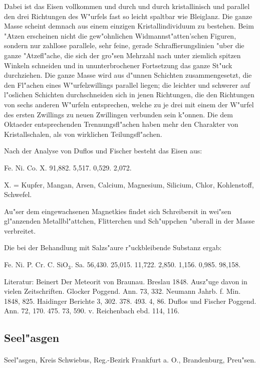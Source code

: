 \documentclass[a4paper, 11pt, oneside]{article}
\begin{document}
Dabei ist das Eisen vollkommen und durch und durch kristallinisch und parallel den drei Richtungen des W"urfels fast so leicht spaltbar wie Bleiglanz. Die ganze Masse scheint demnach aus einem einzigen Kristallindividuum zu bestehen. Beim "Atzen erscheinen nicht die gew"ohnlichen Widmannst"atten'schen Figuren, sondern nur zahllose parallele, sehr feine, gerade Schraffierungslinien "uber die ganze "Atzefl"ache, die sich der gro"sen Mehrzahl nach unter ziemlich spitzen Winkeln schneiden und in ununterbrochener Fortsetzung das ganze St"uck durchziehen. Die ganze Masse wird aus d"unnen Schichten zusammengesetzt, die den Fl"achen eines W"urfelzwillings parallel liegen; die leichter und schwerer auf l"oslichen Schichten durchschneiden sich in jenen Richtungen, die den Richtungen von sechs anderen W"urfeln entsprechen, welche zu je drei mit einem der W"urfel des ersten Zwillings zu neuen Zwillingen verbunden sein k"onnen. Die dem Oktaeder entsprechenden Trennungsfl"achen haben mehr den Charakter von Kristallschalen, als von wirklichen Teilungsfl"achen.

Nach der Analyse von Duflos und Fischer besteht das Eisen aus:

Fe. Ni. Co. X.  
91,882. 5,517. 0,529. 2,072.

X. = Kupfer, Mangan, Arsen, Calcium, Magnesium, Silicium, Chlor, Kohlenstoff, Schwefel.

Au"ser dem eingewachsenen Magnetkies findet sich Schreibersit in wei"sen gl"anzenden Metallbl"attchen, Flitterchen und Sch"uppchen "uberall in der Masse verbreitet.

Die bei der Behandlung mit Salzs"aure r"uckbleibende Substanz ergab:

Fe. Ni. P. Cr. C. SiO$_{3}$. Sa.  
56,430. 25,015. 11,722. 2,850. 1,156. 0,985. 98,158.

Literatur: Beinert Der Meteorit von Braunau. Breslau 1848. Ausz"uge davon in vielen Zeitschriften. Glocker Poggend. Ann. 73, 332. Neumann Jahrb. f. Min. 1848, 825. Haidinger Berichte 3, 302. 378. 493. 4, 86. Duflos und Fischer Poggend. Ann. 72, 170. 475. 73, 590. v. Reichenbach ebd. 114, 116.

\subsection{Seel"asgen}
\normalsize
\paragraph{}
Seel"asgen, Kreis Schwiebus, Reg.-Bezirk Frankfurt a. O., Brandenburg, Preu"sen.
\end{document}
